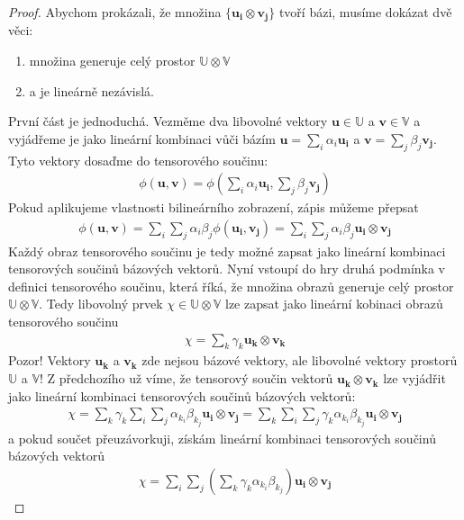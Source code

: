 \documentclass[a5paper,12pt]{amsbook}
\theoremstyle{definition}
\newcommand{\myvec}[1]{\mathbf{#1}}
\newcommand{\myspace}[1]{\mathbb{#1}}
\begin{document}
\begin{proof}
Abychom prokázali, že množina $\{\myvec{u_i}\otimes\myvec{v_j}\}$ tvoří bázi, musíme dokázat
dvě věci:
\begin{enumerate}
	\item množina generuje celý prostor $\myspace{U}\otimes\myspace{V}$
	\item a je lineárně nezávislá.
\end{enumerate}

První část je jednoduchá. Vezměme dva libovolné vektory $\myvec{u}\in\myspace{U}$ a
$\myvec{v}\in\myspace{V}$ a vyjádřeme je jako lineární kombinaci vůči bázím
$\myvec{u} = \sum_{i}\alpha_i\myvec{u_i}$ a $\myvec{v} = \sum_{j}\beta_j\myvec{v_j}$.
Tyto vektory dosaďme do tensorového součinu:
\begin{equation*}
\begin{split}
\phi(\myvec{u}, \myvec{v}) = \phi(\sum_{i}\alpha_i\myvec{u_i}, \sum_{j}\beta_j\myvec{v_j})
\end{split}
\end{equation*}
Pokud aplikujeme vlastnosti bilineárního zobrazení, zápis můžeme přepsat
\begin{equation*}
\begin{split}
\phi(\myvec{u}, \myvec{v}) = \sum_{i}\sum_{j}\alpha_i\beta_j\phi(\myvec{u_i}, \myvec{v_j})
  = \sum_{i}\sum_{j}\alpha_i\beta_j\myvec{u_i}\otimes\myvec{v_j}
\end{split}
\end{equation*}
Každý obraz tensorového součinu je tedy možné zapsat jako lineární kombinaci tensorových součinů
bázových vektorů. Nyní vstoupí do hry druhá podmínka v definici tensorového součinu, která říká,
že množina obrazů generuje celý prostor $\myspace{U}\otimes\myspace{V}$. Tedy libovolný prvek
$\chi\in\myspace{U}\otimes\myspace{V}$ lze zapsat jako lineární kobinaci obrazů tensorového
součinu
\begin{equation*}
\begin{split}
\chi = \sum_{k}\gamma_k\myvec{u_k}\otimes\myvec{v_k}
\end{split}
\end{equation*}
Pozor! Vektory $\myvec{u_k}$ a $\myvec{v_k}$ zde nejsou bázové vektory, ale libovolné vektory
prostorů $\myspace{U}$ a $\myspace{V}$! Z předchozího už víme, že tensorový součin vektorů
$\myvec{u_k}\otimes\myvec{v_k}$ lze vyjádřit jako lineární kombinaci tensorových součinů
bázových vektorů:
\begin{equation*}
\begin{split}
\chi = \sum_{k}\gamma_k\sum_{i}\sum_{j}\alpha_{k_i}\beta_{k_j}\myvec{u_i}\otimes\myvec{v_j}
  = \sum_{k}\sum_{i}\sum_{j}\gamma_k\alpha_{k_i}\beta_{k_j}\myvec{u_i}\otimes\myvec{v_j}
\end{split}
\end{equation*}
a pokud součet přeuzávorkuji, získám lineární kombinaci tensorových součinů bázových vektorů
\begin{equation*}
\begin{split}
\chi = \sum_{i}\sum_{j}(\sum_{k}\gamma_k\alpha_{k_i}\beta_{k_j})\myvec{u_i}\otimes\myvec{v_j}
\end{split}
\end{equation*}


\end{proof}
\end{document}
